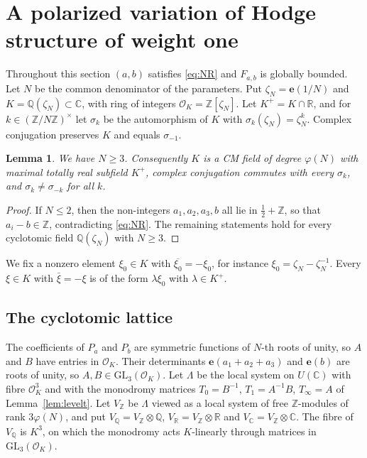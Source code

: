 \documentclass[11pt]{amsart}
\newtheorem{lemma}[theorem]{Lemma}
\theoremstyle{definition}
\theoremstyle{remark}
\numberwithin{equation}{section}
\newcommand{\Q}{\mathbb{Q}}
\newcommand{\Z}{\mathbb{Z}}
\newcommand{\C}{\mathbb{C}}
\newcommand{\R}{\mathbb{R}}
\newcommand{\e}{\mathbf{e}}
\newcommand{\cO}{\mathcal{O}}
\newcommand{\Fab}{F_{a,b}}
\begin{document}
\section{A polarized variation of Hodge structure of weight one}\label{sec:wt1}

Throughout this section $(a,b)$ satisfies \eqref{eq:NR} and $\Fab$ is globally bounded. Let $N$ be the common denominator of the parameters. Put $\zeta_N=\e(1/N)$ and $K=\Q(\zeta_N)\subset\C$, with ring of integers $\cO_K=\Z[\zeta_N]$. Let $K^+=K\cap\R$, and for $k\in(\Z/N\Z)^\times$ let $\sigma_k$ be the automorphism of $K$ with $\sigma_k(\zeta_N)=\zeta_N^k$. Complex conjugation preserves $K$ and equals $\sigma_{-1}$.

\begin{lemma}\label{lem:CM}
We have $N\ge3$. Consequently $K$ is a CM field of degree $\varphi(N)$ with maximal totally real subfield $K^+$, complex conjugation commutes with every $\sigma_k$, and $\sigma_k\ne\sigma_{-k}$ for all $k$.
\end{lemma}

\begin{proof}
If $N\le2$, then the non-integers $a_1,a_2,a_3,b$ all lie in $\frac12+\Z$, so that $a_i-b\in\Z$, contradicting \eqref{eq:NR}. The remaining statements hold for every cyclotomic field $\Q(\zeta_N)$ with $N\ge3$.
\end{proof}

We fix a nonzero element $\xi_0\in K$ with $\overline{\xi_0}=-\xi_0$, for instance $\xi_0=\zeta_N-\zeta_N^{-1}$. Every $\xi\in K$ with $\bar\xi=-\xi$ is of the form $\lambda\xi_0$ with $\lambda\in K^+$.

\subsection{The cyclotomic lattice}\label{subsec:lattice}
The coefficients of $P_a$ and $P_b$ are symmetric functions of $N$-th roots of unity, so $A$ and $B$ have entries in $\cO_K$. Their determinants $\e(a_1+a_2+a_3)$ and $\e(b)$ are roots of unity, so $A,B\in\mathrm{GL}_3(\cO_K)$. Let $\Lambda$ be the local system on $U(\C)$ with fibre $\cO_K^3$ and with the monodromy matrices $T_0=B^{-1}$, $T_1=A^{-1}B$, $T_\infty=A$ of Lemma~\ref{lem:levelt}. Let $V_\Z$ be $\Lambda$ viewed as a local system of free $\Z$-modules of rank $3\varphi(N)$, and put $V_\Q=V_\Z\otimes\Q$, $V_\R=V_\Z\otimes\R$ and $V_\C=V_\Z\otimes\C$. The fibre of $V_\Q$ is $K^3$, on which the monodromy acts $K$-linearly through matrices in $\mathrm{GL}_3(\cO_K)$.
\end{document}
